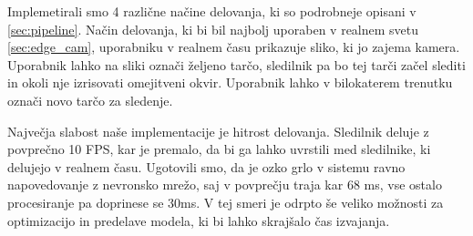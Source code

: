 \documentclass[a4paper,12pt,openright]{book}
\begin{document}
Implemetirali smo 4 različne načine delovanja, ki so podrobneje opisani v \ref{sec:pipeline}. Način delovanja, ki bi bil najbolj uporaben v realnem svetu \ref{sec:edge_cam}, uporabniku v realnem času prikazuje sliko, ki jo zajema kamera. Uporabnik lahko na sliki označi željeno tarčo, sledilnik pa bo tej tarči začel slediti in okoli nje izrisovati omejitveni okvir. Uporabnik lahko v bilokaterem trenutku označi novo tarčo za sledenje.

Največja slabost naše implementacije je hitrost delovanja. Sledilnik deluje z povprečno 10 FPS, kar je premalo, da bi ga lahko uvrstili med sledilnike, ki delujejo v realnem času. Ugotovili smo, da je ozko grlo v sistemu ravno napovedovanje z nevronsko mrežo, saj v povprečju traja kar 68 ms, vse ostalo procesiranje pa doprinese se 30ms. V tej smeri je odrpto še veliko možnosti za optimizacijo in predelave modela, ki bi lahko skrajšalo čas izvajanja.




\printbibliography[heading=bibintoc,title={Celotna literatura}]
\end{document}
